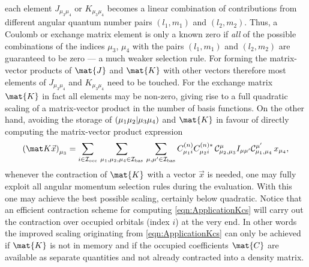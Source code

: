 each element $J_{\mu_3\mu_4}$ or $K_{\mu_3\mu_4}$
becomes a linear combination of contributions from
different angular quantum number pairs $(l_1, m_1)$ and $(l_2, m_2)$.
Thus, a Coulomb or exchange matrix element is only a known zero
if \emph{all} of the possible combinations of the indices $\mu_3$, $\mu_4$
with the pairs $(l_1, m_1)$ and $(l_2, m_2)$ are guaranteed to be zero
--- a much weaker selection rule.
For forming the matrix-vector products of $\mat{J}$ and $\mat{K}$
with other vectors
therefore most elements of $J_{\mu_3\mu_4}$ and $K_{\mu_3\mu_4}$
need to be touched.
For the exchange matrix $\mat{K}$ in fact all elements may be non-zero,
giving rise to a full quadratic scaling of a matrix-vector product
in the number of basis functions.
On the other hand, avoiding the storage of $\left( \mu_1\mu_2 \middle| \mu_3\mu_4 \right)$
and $\mat{K}$ in favour of directly computing
the matrix-vector product expression
\begin{equation}
	\left(\matK \vec{x}\right)_{\mu_3}
	= \sum_{i\in\Iocc} \, \sum_{\mu_1,\mu_2,\mu_4 \in\Ibas} \, \sum_{\mu,\mu'\in\Ibas}
		C^{(n)}_{\mu_1 i} C^{(n)\ast}_{\mu_2 i} \,
		\csC^{\mu}_{\mu_2,\mu_3}
		I_{\mu\mu'} \csC^{\mu'}_{\mu_1,\mu_4}
		\, x_{\mu_4},
	\label{eqn:ApplicationKcs}
\end{equation}
whenever the contraction of $\mat{K}$ with a vector $\vec{x}$ is needed,
one may fully exploit all angular momentum selection rules during the evaluation.
With this one may achieve the best possible scaling, certainly below quadratic.
Notice that an efficient contraction scheme for computing \eqref{eqn:ApplicationKcs}
will carry out the contraction over occupied orbitals (index $i$) at the very end.
In other words the improved scaling originating from \eqref{eqn:ApplicationKcs}
can only be achieved if $\mat{K}$ is not in memory
and if the occupied coefficients $\mat{C}$ are available as separate quantities
and not already contracted into a density matrix.

